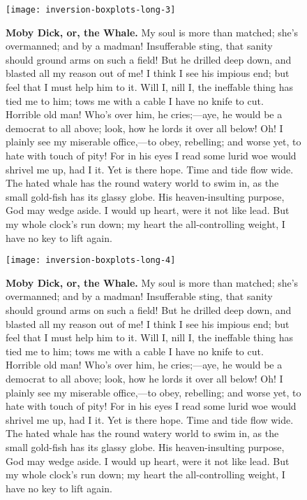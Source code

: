 \documentclass{article}
\begin{document}
\begin{figure}[!htp]
  \begin{center}
      \texttt{[image: inversion-boxplots-long-3]}
    \caption{
        \textbf{Moby Dick, or, the Whale.}
My soul is more than matched; she's overmanned; and by a madman! Insufferable sting, that sanity should ground arms on such a field! But he drilled deep down, and blasted all my reason out of me! I think I see his impious end; but feel that I must help him to it. Will I, nill I, the ineffable thing has tied me to him; tows me with a cable I have no knife to cut. Horrible old man! Who's over him, he cries;—aye, he would be a democrat to all above; look, how he lords it over all below! Oh! I plainly see my miserable office,—to obey, rebelling; and worse yet, to hate with touch of pity! For in his eyes I read some lurid woe would shrivel me up, had I it. Yet is there hope. Time and tide flow wide. The hated whale has the round watery world to swim in, as the small gold-fish has its glassy globe. His heaven-insulting purpose, God may wedge aside. I would up heart, were it not like lead. But my whole clock's run down; my heart the all-controlling weight, I have no key to lift again. 
    }
  \end{center}
\end{figure}

\begin{figure}[!htp]
  \begin{center}
      \texttt{[image: inversion-boxplots-long-4]}
    \caption{
        \textbf{Moby Dick, or, the Whale.}
My soul is more than matched; she's overmanned; and by a madman! Insufferable sting, that sanity should ground arms on such a field! But he drilled deep down, and blasted all my reason out of me! I think I see his impious end; but feel that I must help him to it. Will I, nill I, the ineffable thing has tied me to him; tows me with a cable I have no knife to cut. Horrible old man! Who's over him, he cries;—aye, he would be a democrat to all above; look, how he lords it over all below! Oh! I plainly see my miserable office,—to obey, rebelling; and worse yet, to hate with touch of pity! For in his eyes I read some lurid woe would shrivel me up, had I it. Yet is there hope. Time and tide flow wide. The hated whale has the round watery world to swim in, as the small gold-fish has its glassy globe. His heaven-insulting purpose, God may wedge aside. I would up heart, were it not like lead. But my whole clock's run down; my heart the all-controlling weight, I have no key to lift again. 
    }
  \end{center}
\end{figure}
\end{document}
